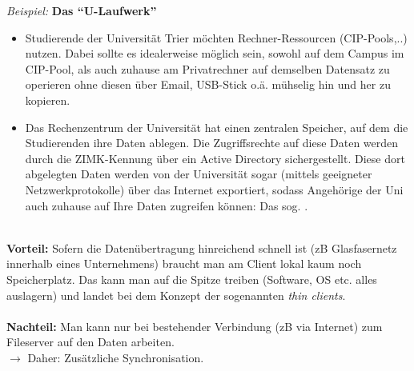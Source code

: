 \textit{Beispiel:} \textbf{Das ``U-Laufwerk''}
\begin{itemize}
	\item Studierende der Universität Trier möchten Rechner-Ressourcen (CIP-Pools,..) nutzen. Dabei sollte es idealerweise möglich sein, sowohl auf dem Campus im CIP-Pool, als auch zuhause am Privatrechner auf demselben Datensatz zu operieren ohne diesen über Email, USB-Stick o.ä. mühselig hin und her zu kopieren.
\item Das Rechenzentrum der Universität hat einen zentralen Speicher, auf dem die Studierenden ihre Daten ablegen. Die Zugriffsrechte auf diese Daten werden durch die ZIMK-Kennung über ein Active Directory sichergestellt. Diese dort abgelegten Daten werden von der Universität sogar (mittels geeigneter Netzwerkprotokolle) über das Internet exportiert, sodass Angehörige der Uni auch zuhause auf Ihre Daten zugreifen können: Das sog. .
\end{itemize}
~\\
\textbf{Vorteil:} Sofern die Datenübertragung hinreichend schnell ist (zB Glasfasernetz innerhalb eines Unternehmens) braucht man am Client lokal kaum noch Speicherplatz. Das kann man auf die Spitze treiben (Software, OS etc. alles auslagern) und landet bei dem Konzept der sogenannten \textit{thin clients}.\\~\\
\textbf{Nachteil:} Man kann nur bei bestehender Verbindung (zB via Internet) zum Fileserver auf den Daten arbeiten.\\ $\to$ Daher: Zusätzliche Synchronisation.\\
